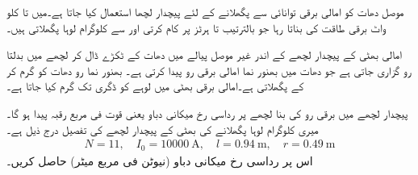 موصل دھات کو امالی برقی توانائی سے پگھلانے کے لئے پیچدار لچھا استعمال کیا جاتا ہے۔میں      تا   کلو واٹ برقی طاقت کی بناتا رہا جو بالترتیب   تا   ہرٹز پر کام کرتی اور   سے   کلوگرام  لوہا پگھلاتی ہیں۔

امالی  بھٹی کے پیچدار لچھے کے اندر غیر موصل پیالے  میں  دھات کے ٹکڑے ڈال کر لچھے میں بدلتا رو گزاری جاتی ہے جو دھات میں بھنور نما امالی برقی رو پیدا کرتی ہے۔  بھنور نما رو دھات کو  گرم کر کے پگھلاتی ہے۔امالی برقی بھٹی میں لوہے کو   ڈگری  تک گرم کیا جاتا ہے۔

پیچدار لچھے میں برقی رو  کی بنا لچھے پر  رداسی رخ میکانی دباو یعنی قوت فی مربع رقبہ پیدا ہو گا۔میری  کلوگرام لوہا پگھلانے کی بھٹی کے پیچدار لچھے کی تفصیل درج ذیل ہے۔
\begin{align*}
N=11, \quad I_0=\SI{10000}{\ampere}, \quad l=\SI{0.94}{\meter}, \quad r=\SI{0.49}{\meter}
\end{align*}
اس پر رداسی رخ میکانی دباو  (نیوٹن فی مربع میٹر)  حاصل کریں۔


